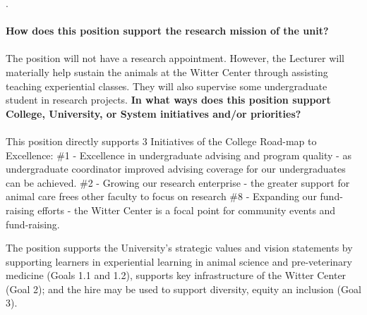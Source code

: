 \documentclass[11pt]{article}
\begin{document}
.\\~\\
\textbf{\rmfamily How does this position support the research mission of the unit?}\\~\\
The position will not have a research appointment. However,  the Lecturer will materially help sustain the animals at the Witter Center through assisting teaching experiential classes. They will also supervise some undergraduate student in research projects. 
\newpage
\noindent\textbf{\rmfamily In what ways does this position support College, University, or System initiatives and/or priorities?}
\\~\\
This position directly supports 3 Initiatives of the College Road-map to Excellence:
\#1 - Excellence in undergraduate advising and program quality - as undergraduate coordinator improved advising coverage for our undergraduates can be achieved.
\#2 - Growing our research enterprise - the greater support for animal care frees other faculty to focus on research
\#8 - Expanding our fund-raising efforts - the Witter Center is a focal point for community events and fund-raising. 

The position supports the University's strategic values and vision statements by supporting learners in experiential learning in animal science and pre-veterinary medicine (Goals 1.1 and 1.2), supports key infrastructure of the Witter Center (Goal 2); and the hire may be used to support diversity, equity an inclusion  (Goal 3).
\end{document}
